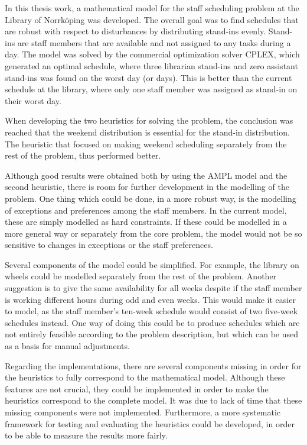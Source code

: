 In this thesis work, a mathematical model for the staff scheduling problem at the Library of Norrköping was developed. The overall goal was to find schedules that are robust with respect to disturbances by distributing stand-ins evenly. Stand-ins are staff members that are available and not assigned to any tasks during a day. The model was solved by the commercial optimization solver CPLEX, which generated an optimal schedule, where three librarian stand-ins and zero assistant stand-ins was found on the worst day (or days). This is better than the current schedule at the library, where only one staff member was assigned as stand-in on their worst day.

When developing the two heuristics for solving the problem, the conclusion was reached that the weekend distribution is essential for the stand-in distribution. The heuristic that focused on making weekend scheduling separately from the rest of the problem, thus performed better. 

Although good results were obtained both by using the AMPL model and the second heuristic, there is room for further development in the modelling of the problem. One thing which could be done, in a more robust way, is the modelling of exceptions and preferences among the staff members. In the current model, these are simply modelled as hard constraints. If these could be modelled in a more general way or separately from the core problem, the model would not be so sensitive to changes in exceptions or the staff preferences.

Several components of the model could be simplified. For example, the library on wheels could be modelled separately from the rest of the problem. Another suggestion is to give the same availability for all weeks despite if the staff member is working different hours during odd and even weeks. This would make it easier to model, as the staff member's ten-week schedule would consist of two five-week schedules instead. One way of doing this could be to produce schedules which are not entirely feasible according to the problem description, but which can be used as a basis for manual adjustments.

Regarding the implementations, there are several components missing in order for the heuristics to fully correspond to the mathematical model. Although these features are not crucial, they could be implemented in order to make the heuristics correspond to the complete model. It was due to lack of time that these missing components were not implemented. Furthermore, a more systematic framework for testing and evaluating the heuristics could be developed, in order to be able to measure the results more fairly.



